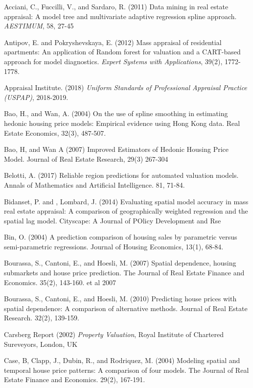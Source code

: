\documentclass[colTwo]{anon}
\theoremstyle{definition}
\begin{document}
\begin{thebibliography}{50}
\harvarditem{}{}{}Acciani, C., Fuccilli, V., and Sardaro, R. (2011) Data mining in real estate appraisal: A model tree and multivariate adaptive regression spline approach. \textit{AESTIMUM}, 58, 27-45

\harvarditem{}{}{}Antipov, E. and Pokryshevskaya, E. (2012) Mass appraisal of residential apartments: An application of Random forest for valuation and a CART-based approach for model diagnostics. \textit{Expert Systems with Applications}, 39(2), 1772-1778.

\harvarditem{}{}{}Appraisal Institute. (2018) \textit{Uniform Standards of Professional Appraisal Practice (USPAP)}, 2018-2019.

\harvarditem{}{}{}Bao, H., and Wan, A. (2004) On the use of spline smoothing in estimating hedonic housing price models: Empirical evidence using Hong Kong data. Real Estate Economics, 32(3), 487-507.

\harvarditem{}{}{}Bao, H, and Wan A (2007) Improved Estimators of Hedonic Housing Price Model. Journal of Real Estate Research, 29(3) 267-304

\harvarditem{}{}{}Belotti, A. (2017) Reliable region predictions for automated valuation models. Annals of Mathematics and Artificial Intelligence. 81, 71-84.

\harvarditem{}{}{}Bidanset, P. and , Lombard, J. (2014) Evaluating spatial model accuracy in mass real estate appraisal: A comparison of geographically weighted regression and the spatial lag model. Cityscape: A Journal of POlicy Development and Rse

\harvarditem{}{}{}Bin, O. (2004) A prediction comparison of housing sales by parametric versus semi-parametric regressions. Journal of Housing Economics, 13(1), 68-84.

\harvarditem{}{}{}Bourassa, S., Cantoni, E., and Hoesli, M. (2007) Spatial dependence, housing submarkets and house price prediction. The Journal of Real Estate Finance and Economics. 35(2), 143-160.  et al 2007

\harvarditem{}{}{}Bourassa, S., Cantoni, E., and Hoesli, M. (2010) Predicting house prices with spatial dependence: A comparison of alternative methods. Journal of Real Estate Research. 32(2), 139-159.

\harvarditem{}{}{}Carsberg Report (2002) \textit{Property Valuation}, Royal Institute of Chartered Sureveyors, London, UK

\harvarditem{}{}{}Case, B, Clapp, J., Dubin, R., and Rodriquez, M. (2004) Modeling spatial and temporal house price patterns: A comparison of four models. The Journal of Real Estate Finance and Economics. 29(2), 167-191.


\end{thebibliography}
\end{document}
